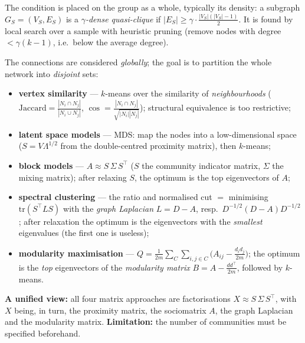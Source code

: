 \documentclass[11pt,a4paper]{article}
\theoremstyle{definition}
\begin{document}
\begin{defbox}
The condition is placed on the group as a whole, typically its density: a subgraph
$G_S=(V_S,E_S)$ is a \emph{$\gamma$-dense quasi-clique} if
$|E_S|\ge\gamma\cdot\frac{|V_S|(|V_S|-1)}{2}$. It is found by local search over a sample with
heuristic pruning (remove nodes with degree $<\gamma(k-1)$, i.e.\ below the average degree).
\end{defbox}

\begin{defbox}
The connections are considered \emph{globally}; the goal is to partition the whole network
into \emph{disjoint} sets:
\begin{itemize}
\item \textbf{vertex similarity} --- $k$-means over the similarity of \emph{neighbourhoods}
      ($\mathrm{Jaccard}=\frac{|N_i\cap N_j|}{|N_i\cup N_j|}$,
      $\cos=\frac{|N_i\cap N_j|}{\sqrt{|N_i||N_j|}}$); structural equivalence is too
      restrictive;
\item \textbf{latent space models} --- MDS: map the nodes into a low-dimensional space
      ($S=V\Lambda^{1/2}$ from the double-centred proximity matrix), then $k$-means;
\item \textbf{block models} --- $A\approx S\,\Sigma\,S^{\!\top}$ ($S$ the community
      indicator matrix, $\Sigma$ the mixing matrix); after relaxing $S$, the optimum is the
      top eigenvectors of $A$;
\item \textbf{spectral clustering} --- the ratio and normalised cut $=$ minimising
      $\mathrm{tr}(S^{\!\top}LS)$ with the \emph{graph Laplacian} $L=D-A$, resp.\
      $D^{-1/2}(D-A)D^{-1/2}$; after relaxation the optimum is the eigenvectors with the
      \emph{smallest} eigenvalues (the first one is useless);
\item \textbf{modularity maximisation} --- $Q=\frac{1}{2m}\sum_C\sum_{i,j\in C}
      \big(A_{ij}-\frac{d_id_j}{2m}\big)$; the optimum is the \emph{top} eigenvectors of the
      \emph{modularity matrix} $B=A-\frac{dd^{\!\top}}{2m}$, followed by $k$-means.
\end{itemize}
\textbf{A unified view:} all four matrix approaches are factorisations
$X\approx S\,\Sigma\,S^{\!\top}$, with $X$ being, in turn, the proximity matrix, the
sociomatrix $A$, the graph Laplacian and the modularity matrix. \textbf{Limitation:} the
number of communities must be specified beforehand.
\end{defbox}
\end{document}
